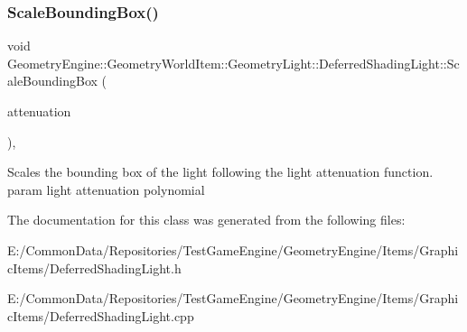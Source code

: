 \mbox{\label{class_geometry_engine_1_1_geometry_world_item_1_1_geometry_light_1_1_deferred_shading_light_afeb4ce0c059042c837cc853701811be9}} 
\subsubsection{\texorpdfstring{ScaleBoundingBox()}{ScaleBoundingBox()}}
{\footnotesize\ttfamily void Geometry\+Engine\+::\+Geometry\+World\+Item\+::\+Geometry\+Light\+::\+Deferred\+Shading\+Light\+::\+Scale\+Bounding\+Box (\begin{DoxyParamCaption}\item[{const Q\+Vector3D \&}]{attenuation }\end{DoxyParamCaption})\hspace{0.3cm}{\ttfamily [protected]}, {\ttfamily [virtual]}}

Scales the bounding box of the light following the light attenuation function. param light attenuation polynomial 

The documentation for this class was generated from the following files\+:\begin{DoxyCompactItemize}
\item 
E\+:/\+Common\+Data/\+Repositories/\+Test\+Game\+Engine/\+Geometry\+Engine/\+Items/\+Graphic\+Items/Deferred\+Shading\+Light.\+h\item 
E\+:/\+Common\+Data/\+Repositories/\+Test\+Game\+Engine/\+Geometry\+Engine/\+Items/\+Graphic\+Items/Deferred\+Shading\+Light.\+cpp\end{DoxyCompactItemize}
